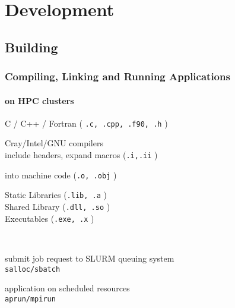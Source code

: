 \section{Development}
\subsection{Building}
\begin{frame}[fragile]
\frametitle{Compiling, Linking and Running Applications}
\framesubtitle{on HPC clusters}
 \begin{description}
    \item [source code] C / C++ / Fortran ( \verb|.c, .cpp, .f90, .h|  )
    \item [compile] Cray/Intel/GNU compilers\\ include headers, expand macros (\verb|.i,.ii| )
    \item [assemble] into machine code (\verb|.o, .obj| )
    \item [link] Static Libraries (\verb|.lib, .a|  ) \\ Shared Library (\verb|.dll, .so| ) \\ Executables (\verb|.exe, .x| )
    \item ~ 
    \item [request allocation] submit job request to SLURM queuing system \\ \verb|salloc/sbatch|
    \item [run] application on scheduled resources \\ \verb|aprun/mpirun|
 \end{description}
\end{frame}

